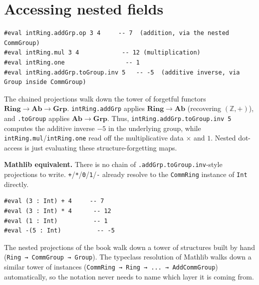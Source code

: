 \section{Accessing nested fields}\label{sec:09-rings:06-accessing-fields:1}

\begin{lstlisting}
#eval intRing.addGrp.op 3 4     -- 7  (addition, via the nested CommGroup)
#eval intRing.mul 3 4            -- 12 (multiplication)
#eval intRing.one                 -- 1
#eval intRing.addGrp.toGroup.inv 5   -- -5  (additive inverse, via Group inside CommGroup)
\end{lstlisting}

\begin{mathreading}

The chained projections walk down the tower of forgetful functors \(\mathbf{Ring} \to \mathbf{Ab} \to \mathbf{Grp}\). \texttt{intRing.addGrp} applies \(\mathbf{Ring}\to\mathbf{Ab}\) (recovering \((\mathbb{Z},
+)\)), and \texttt{.toGroup} applies \(\mathbf{Ab}\to\mathbf{Grp}\). Thus, \texttt{intRing.addGrp.toGroup.inv 5} computes the additive inverse \(-5\) in the underlying group, while \texttt{intRing.mul}/\texttt{intRing.one} read off the multiplicative data \(\times\) and \(1\). Nested dot-access is just evaluating these structure-forgetting maps.

\end{mathreading}

\textbf{Mathlib equivalent.} There is no chain of \texttt{.addGrp.toGroup.inv}-style projections to write. \texttt{+}/\texttt{*}/\texttt{0}/\texttt{1}/\texttt{-\allowbreak{}} already resolve to the \texttt{CommRing} instance of \texttt{Int} directly.

\begin{lstlisting}
#eval (3 : Int) + 4     -- 7
#eval (3 : Int) * 4      -- 12
#eval (1 : Int)          -- 1
#eval -(5 : Int)          -- -5
\end{lstlisting}

The nested projections of the book walk down a tower of structures built by hand (\texttt{Ring → CommGroup → Group}). The typeclass resolution of Mathlib walks down a similar tower of instances (\texttt{CommRing → Ring → ... → AddCommGroup}) automatically, so the notation never needs to name which layer it is coming from.
